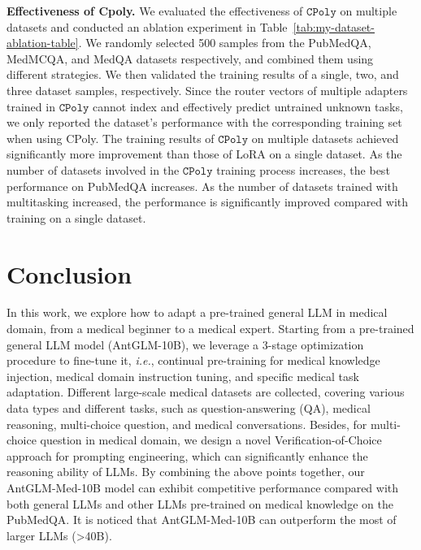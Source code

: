 \documentclass{article} %
\begin{document}
\textbf{Effectiveness of Cpoly.} We evaluated the effectiveness of $\texttt{CPoly}$ on multiple datasets and conducted an ablation experiment in Table~\ref{tab:my-dataset-ablation-table}. We randomly selected 500 samples from the PubMedQA, MedMCQA, and MedQA datasets respectively, and combined them using different strategies. We then validated the training results of a single, two, and three dataset samples, respectively. Since the router vectors of multiple adapters trained in $\texttt{CPoly}$ cannot index and effectively predict untrained unknown tasks, we only reported the dataset's performance with the corresponding training set when using CPoly. The training results of $\texttt{CPoly}$ on multiple datasets achieved significantly more improvement than those of LoRA on a single dataset. As the number of datasets involved in the $\texttt{CPoly}$ training process increases, the best performance on PubMedQA increases. As the number of datasets trained with multitasking increased, the performance is significantly improved compared with training on a single dataset.



\section{Conclusion}
In this work, we explore how to adapt a pre-trained general LLM in medical domain, from a medical beginner to a medical expert. Starting from a pre-trained general LLM model (AntGLM-10B), we leverage a 3-stage optimization procedure to fine-tune it, \textit{i.e.}, continual pre-training for medical knowledge injection, medical domain instruction tuning, and specific medical task adaptation. Different large-scale medical datasets are collected, covering various data types and different tasks, such as question-answering (QA), medical reasoning, multi-choice question, and medical conversations. Besides, for multi-choice question in medical domain, we design a novel Verification-of-Choice approach for prompting engineering, which can significantly enhance the reasoning ability of LLMs. By combining the above points together, our AntGLM-Med-10B model can exhibit competitive performance compared with both general LLMs and other LLMs pre-trained on medical knowledge on the PubMedQA. It is noticed that AntGLM-Med-10B can outperform the most of larger LLMs (>40B).
\end{document}
